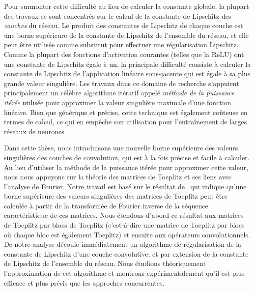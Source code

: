 Pour surmonter cette difficulté au lieu de calculer la constante globale, la plupart des travaux se sont concentrés sur le calcul de la constante de Lipschitz des \emph{couches} du réseau.
Le produit des constantes de Lipschitz de chaque couche est une borne supérieure de la constante de Lipschitz de l'ensemble du réseau, et elle peut être utilisée comme substitut pour effectuer une régularisation Lipschitz.
Comme la plupart des fonctions d'activation courantes (telles que la ReLU) ont une constante de Lipschitz égale à un, la principale difficulté consiste à calculer la constante de Lipschitz de l'application linéaire sous-jacente qui est égale à sa plus grande valeur singulière.
Les travaux dans ce domaine de recherche s'appuient principalement un célèbre algorithme itératif appelé \emph{méthode de la puissance itérée} \cite{golub2000eigenvalue} utilisée pour approximer la valeur singulière maximale d'une fonction linéaire.
Bien que générique et précise, cette technique est également coûteuse en termes de calcul, ce qui en empêche son utilisation pour l'entraînement de larges réseaux de neurones. 

Dans cette thèse, nous introduisons une nouvelle borne supérieure des valeurs singulières des couches de convolution, qui est à la fois précise et facile à calculer.
Au lieu d'utiliser la méthode de la puissance itérée pour approximer cette valeur, nous nous appuyons sur la théorie des matrices de Toeplitz et ses liens avec l'analyse de Fourier.
Notre travail est basé sur le résultat de~\citet{gray2006toeplitz} qui indique qu'une borne supérieure des valeurs singulières des matrices de Toeplitz peut être calculée à partir de la transformée de Fourier inverse de la séquence caractéristique de ces matrices.
Nous étendons d'abord ce résultat aux matrices de Toeplitz par blocs de Toeplitz (c'est-à-dire une matrice de Toeplitz par blocs où chaque bloc est également Toeplitz) et ensuite aux opérateurs convolutionnels.
De notre analyse découle immédiatement un algorithme de régularisation de la constante de Lipschitz d'une couche convolutive, et par extension de la constante de Lipschitz de l'ensemble du réseau.
Nous étudions théoriquement l'approximation de cet algorithme et montrons expérimentalement qu'il est plus efficace et plus précis que les approches concurrentes.

